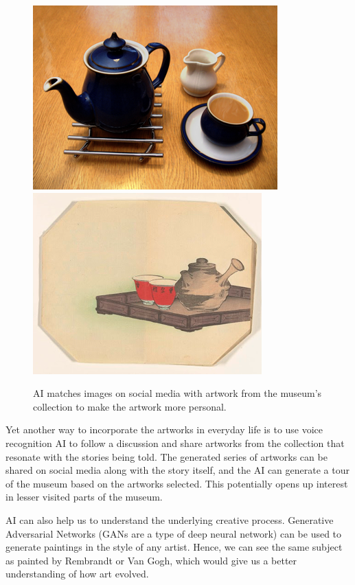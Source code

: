 \documentclass[12pt,a4paper]{report}
\begin{document}
    \begin{figure}[h]
      \centering
      \includegraphics{tea.png}
      \includegraphics{tea2.png}
      \caption{AI matches images on social media with artwork from the museum's collection to make the artwork more personal.}
      \label{ai}
    \end{figure}

  \par
    Yet another way to incorporate the artworks in everyday life is to use voice recognition AI to follow a discussion and share artworks from the collection that resonate with the stories being told. The generated series of artworks can be shared on social media along with the story itself, and the AI can generate a tour of the museum based on the artworks selected. This potentially opens up interest in lesser visited parts of the museum.

  \par
    AI can also help us to understand the underlying creative process. Generative Adversarial Networks (GANs are a type of deep neural network) can be used to generate paintings in the style of any artist. Hence, we can see the same subject as painted by Rembrandt or Van Gogh, which would give us a better understanding of how art evolved. 








    \printbibliography
\end{document}
